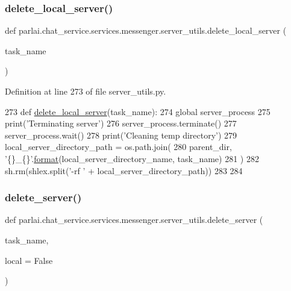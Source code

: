 \subsubsection{\texorpdfstring{delete\+\_\+local\+\_\+server()}{delete\_local\_server()}}
{\footnotesize\ttfamily def parlai.\+chat\+\_\+service.\+services.\+messenger.\+server\+\_\+utils.\+delete\+\_\+local\+\_\+server (\begin{DoxyParamCaption}\item[{}]{task\+\_\+name }\end{DoxyParamCaption})}



Definition at line 273 of file server\+\_\+utils.\+py.


\begin{DoxyCode}
273 \textcolor{keyword}{def }\hyperlink{namespaceparlai_1_1mturk_1_1core_1_1server__utils_a9b4f4c3f696be001c2fa96b3690af83c}{delete\_local\_server}(task\_name):
274     \textcolor{keyword}{global} server\_process
275     print(\textcolor{stringliteral}{'Terminating server'})
276     server\_process.terminate()
277     server\_process.wait()
278     print(\textcolor{stringliteral}{'Cleaning temp directory'})
279     local\_server\_directory\_path = os.path.join(
280         parent\_dir, \textcolor{stringliteral}{'\{\}\_\{\}'}.\hyperlink{namespaceparlai_1_1chat__service_1_1services_1_1messenger_1_1shared__utils_a32e2e2022b824fbaf80c747160b52a76}{format}(local\_server\_directory\_name, task\_name)
281     )
282     sh.rm(shlex.split(\textcolor{stringliteral}{'-rf '} + local\_server\_directory\_path))
283 
284 
\end{DoxyCode}
\mbox{\label{namespaceparlai_1_1chat__service_1_1services_1_1messenger_1_1server__utils_a0dd350cc27da7cfdc225f8daf19d5e57}} 
\subsubsection{\texorpdfstring{delete\+\_\+server()}{delete\_server()}}
{\footnotesize\ttfamily def parlai.\+chat\+\_\+service.\+services.\+messenger.\+server\+\_\+utils.\+delete\+\_\+server (\begin{DoxyParamCaption}\item[{}]{task\+\_\+name,  }\item[{}]{local = {\ttfamily False} }\end{DoxyParamCaption})}



